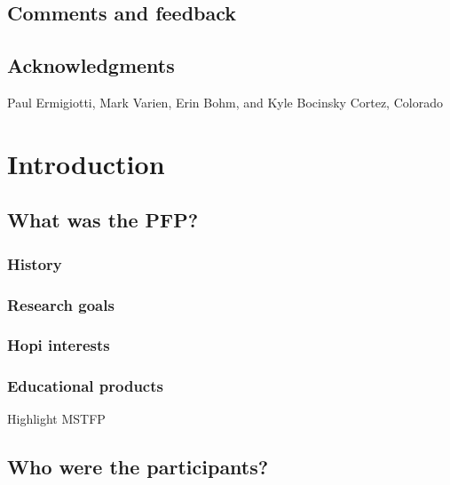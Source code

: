 \documentclass[12pt,]{krantz}
\let\BeginKnitrBlock\begin \let\EndKnitrBlock\end
\begin{document}
\hypertarget{comments-and-feedback}{%
\section*{Comments and feedback}\label{comments-and-feedback}}


\hypertarget{acknowledgments}{%
\section*{Acknowledgments}\label{acknowledgments}}


\BeginKnitrBlock{flushright}
Paul Ermigiotti, Mark Varien, Erin Bohm, and Kyle Bocinsky Cortez,
Colorado
\EndKnitrBlock{flushright}

\mainmatter

\hypertarget{introduction}{%
\chapter{Introduction}\label{introduction}}

\hypertarget{what-was-the-pfp}{%
\section{What was the PFP?}\label{what-was-the-pfp}}

\hypertarget{history}{%
\subsection*{History}\label{history}}


\hypertarget{research-goals}{%
\subsection*{Research goals}\label{research-goals}}


\hypertarget{hopi-interests}{%
\subsection*{Hopi interests}\label{hopi-interests}}


\hypertarget{educational-products}{%
\subsection*{Educational products}\label{educational-products}}


Highlight MSTFP

\hypertarget{who-were-the-participants}{%
\section{Who were the participants?}\label{who-were-the-participants}}
\end{document}
